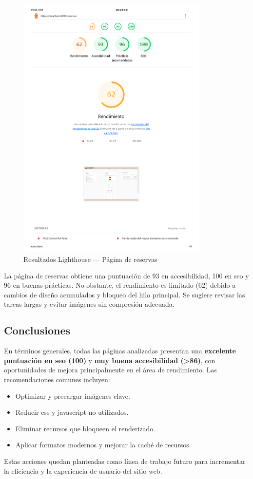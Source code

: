 \begin{figure}[h!tb]
  \centering
  \includegraphics[width=0.85\textwidth]{figs/reservas_lighthouse.png}
  \caption{Resultados Lighthouse — Página de reservas}
  \label{fig:lighthouse-reservas}
\end{figure}

La página de reservas obtiene una puntuación de 93 en accesibilidad, 100 en \gls{seo} y 96 en buenas prácticas. No obstante, el rendimiento es limitado (62) debido a cambios de diseño acumulados y bloqueo del hilo principal. Se sugiere revisar las tareas largas y evitar imágenes sin compresión adecuada.

\subsection*{Conclusiones}

En términos generales, todas las páginas analizadas presentan una \textbf{excelente puntuación en \gls{seo} (100)} y \textbf{muy buena accesibilidad (>86)}, con oportunidades de mejora principalmente en el área de rendimiento. Las recomendaciones comunes incluyen:

\begin{itemize}
    \item Optimizar y precargar imágenes clave.
    \item Reducir \gls{css} y \gls{javascript} no utilizados.
    \item Eliminar recursos que bloqueen el renderizado.
    \item Aplicar formatos modernos y mejorar la caché de recursos.
\end{itemize}

Estas acciones quedan planteadas como línea de trabajo futuro para incrementar la eficiencia y la experiencia de usuario del sitio web.